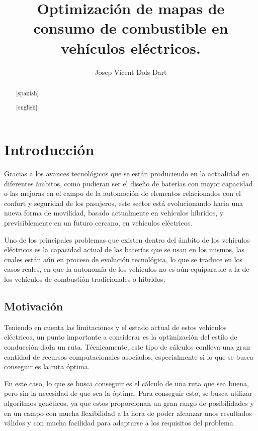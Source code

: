 \documentclass[11pt,spanish,listoffigures,listoftables]{tfgetsinf}
\title{Optimización de mapas de consumo de combustible en vehículos eléctricos.}
\author{Josep Vicent Dols Dart}
\begin{document}
	\lstset{language=Python, frame=none}

\begin{abstract}[spanish]

\end{abstract}
\begin{abstract}[english]

\end{abstract}

\mainmatter


\chapter{Introducción}
Gracias a los avances tecnológicos que se están produciendo en la actualidad en diferentes ámbitos, como pudieran ser el diseño de baterías con mayor capacidad o las mejoras en el campo de la automoción de elementos relacionados con el confort y seguridad de los pasajeros, este sector está evolucionando hacia una nueva forma de movilidad, basado actualmente en vehículos híbridos, y previsiblemente en un futuro cercano, en vehículos eléctricos.

Uno de los principales problemas que existen dentro del ámbito de los vehículos eléctricos es la capacidad actual de las baterías que se usan en los mismos, las cuales están aún en proceso de evolución tecnológica, lo que se traduce en los casos reales, en que la autonomía de los vehículos no es aún equiparable a la de los vehículos de combustión tradicionales o híbridos.

\section{Motivación}
Teniendo en cuenta las limitaciones y el estado actual de estos vehículos eléctricos, un punto importante a considerar es la optimización del estilo de conducción dada un ruta. Técnicamente, este tipo de cálculos conlleva una gran cantidad de recursos computacionales asociados, especialmente si lo que se busca conseguir es la ruta óptima.

En este caso, lo que se busca conseguir es el cálculo de una ruta que sea buena, pero sin la necesidad de que sea la óptima. Para conseguir esto, se busca utilizar algoritmos genéticos, ya que estos proporcionan un gran rango de posibilidades y en un campo con mucha flexibilidad a la hora de poder alcanzar unos resultados válidos y con mucha facilidad para adaptarse a los requisitos del problema.
\end{document}
